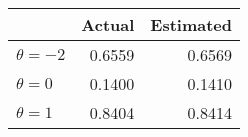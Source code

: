 
\begin{tabular}{lrr}
\toprule
  & Actual & Estimated\\
\midrule
$\theta = -2$ & 0.6559 & 0.6569\\
$\theta = 0$ & 0.1400 & 0.1410\\
$\theta = 1$ & 0.8404 & 0.8414\\
\bottomrule
\end{tabular}
